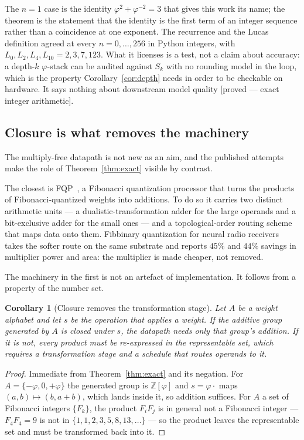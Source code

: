 \documentclass[11pt]{article}
\newtheorem{corollary}{Corollary}
\theoremstyle{definition}
\begin{document}
The $n=1$ case is the identity $\varphi^{2}+\varphi^{-2}=3$ that gives this work
its name; the theorem is the statement that the identity is the first term of an
integer sequence rather than a coincidence at one exponent. The recurrence and the
Lucas definition agreed at every $n=0,\dots,256$ in Python integers, with
$L_0,L_2,L_4,L_{10}=2,3,7,123$. What it licenses is a test, not a claim about
accuracy: a depth-$k$ $\varphi$-stack can be audited against
$S_k$ with no rounding model in the loop, which is the property
Corollary~\ref{cor:depth} needs in order to be checkable on hardware. It says
nothing about downstream model quality [proved --- exact integer arithmetic].

\subsection{Closure is what removes the machinery}\label{sec:closure}

The multiply-free datapath is not new as an aim, and the published attempts make
the role of Theorem~\ref{thm:exact} visible by contrast.

The closest is FQP~\cite{fqp}, a Fibonacci quantization processor that turns the
products of Fibonacci-quantized weights into additions. To do so it carries two
distinct arithmetic units --- a dualistic-transformation adder for the large
operands and a bit-exclusive adder for the small ones --- and a topological-order
routing scheme that maps data onto them. Fibbinary quantization for neural radio
receivers~\cite{fibbinary} takes the softer route on the same substrate and
reports $45\%$ and $44\%$ savings in multiplier power and area: the multiplier is
made cheaper, not removed.

The machinery in the first is not an artefact of implementation. It follows from
a property of the number set.

\begin{corollary}[Closure removes the transformation stage]\label{cor:closure}
Let $A$ be a weight alphabet and let $s$ be the operation that applies a weight.
If the additive group generated by $A$ is closed under $s$, the datapath needs
only that group's addition. If it is not, every product must be re-expressed in
the representable set, which requires a transformation stage and a schedule that
routes operands to it.
\end{corollary}
\begin{proof}
Immediate from Theorem~\ref{thm:exact} and its negation. For
$A=\{-\varphi,0,+\varphi\}$ the generated group is $\mathbb{Z}[\varphi]$ and
$s=\varphi\cdot$ maps $(a,b)\mapsto(b,a+b)$, which lands inside it, so addition
suffices. For $A$ a set of Fibonacci integers $\{F_k\}$, the product $F_iF_j$ is
in general not a Fibonacci integer --- $F_4F_4=9$ is not in
$\{1,1,2,3,5,8,13,\dots\}$ --- so the product leaves the representable set and
must be transformed back into it.
\end{proof}
\end{document}
